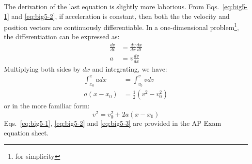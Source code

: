 \documentclass{../../oss-handout}
\newcommand{\mb}[1]{\ensuremath\mathbf{#1}}
\begin{document}
The derivation of the last equation is slightly more laborious. From
Eqs.~\ref{eq:big5-1} and \ref{eq:big5-2}, if acceleration is constant, then
both the the velocity and position vectors are continuously differentiable. In
a one-dimensional problem\footnote{for simplicity}, the differentiation can be
expressed as:
\begin{align*}
  \frac{dv}{dt}&=\frac{dv}{dx}\frac{dx}{dt}\\
  a&=v\frac{dv}{dx}
\end{align*}
Multiplying both sides by $dx$ and integrating, we have:
\begin{align*}
  \int_{x_0}^x adx&=\int_{v_0}^v vdv\\
  a(x-x_0)&=\frac12\left(v^2-v_0^2\right)
\end{align*}
or in the more familiar form:
\begin{equation}
  \boxed{v^2 = v_0^2+ 2a(x-x_0)}
  \label{eq:big5-3}
\end{equation}
Eqs.~\ref{eq:big5-1}, \ref{eq:big5-2} and \ref{eq:big5-3} are provided in the
AP Exam equation sheet.
%  
%
\end{document}
